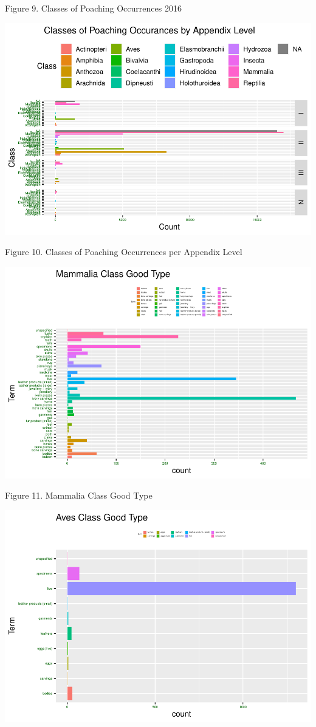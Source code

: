 \documentclass[
  12pt,
]{article}
\begin{document}
Figure 9. Classes of Poaching Occurrences 2016

\includegraphics{Wood_ENV872_Project_files/figure-latex/unnamed-chunk-14-1.pdf}

Figure 10. Classes of Poaching Occurrences per Appendix Level

\includegraphics{Wood_ENV872_Project_files/figure-latex/unnamed-chunk-15-1.pdf}

Figure 11. Mammalia Class Good Type

\includegraphics{Wood_ENV872_Project_files/figure-latex/unnamed-chunk-16-1.pdf}
\end{document}

